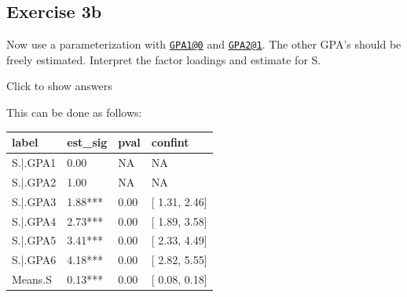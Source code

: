 \documentclass[
]{book}
\newenvironment{Shaded}{\begin{snugshade}}{\end{snugshade}}
\newcommand{\AttributeTok}[1]{\textcolor[rgb]{0.77,0.63,0.00}{#1}}
\newcommand{\CommentTok}[1]{\textcolor[rgb]{0.56,0.35,0.01}{\textit{#1}}}
\newcommand{\ConstantTok}[1]{\textcolor[rgb]{0.00,0.00,0.00}{#1}}
\newcommand{\FunctionTok}[1]{\textcolor[rgb]{0.00,0.00,0.00}{#1}}
\newcommand{\NormalTok}[1]{#1}
\newcommand{\OtherTok}[1]{\textcolor[rgb]{0.56,0.35,0.01}{#1}}
\newcommand{\SpecialCharTok}[1]{\textcolor[rgb]{0.00,0.00,0.00}{#1}}
\newcommand{\StringTok}[1]{\textcolor[rgb]{0.31,0.60,0.02}{#1}}
\begin{document}
\hypertarget{exercise-3b}{%
\subsection{Exercise 3b}\label{exercise-3b}}

Now use a parameterization with \href{mailto:GPA1@0}{\nolinkurl{GPA1@0}} and \href{mailto:GPA2@1}{\nolinkurl{GPA2@1}}. The other GPA's should be freely estimated.
Interpret the factor loadings and estimate for S.

Click to show answers

This can be done as follows:

\begin{Shaded}
\end{Shaded}

\begin{tabular}[t]{l|l|l|l}
\hline
label & est\_sig & pval & confint\\
\hline
S.|.GPA1 & 0.00 & NA & NA\\
\hline
S.|.GPA2 & 1.00 & NA & NA\\
\hline
S.|.GPA3 & 1.88*** & 0.00 & [ 1.31,  2.46]\\
\hline
S.|.GPA4 & 2.73*** & 0.00 & [ 1.89,  3.58]\\
\hline
S.|.GPA5 & 3.41*** & 0.00 & [ 2.33,  4.49]\\
\hline
S.|.GPA6 & 4.18*** & 0.00 & [ 2.82,  5.55]\\
\hline
Means.S & 0.13*** & 0.00 & [ 0.08,  0.18]\\
\hline
\end{tabular}
\end{document}
